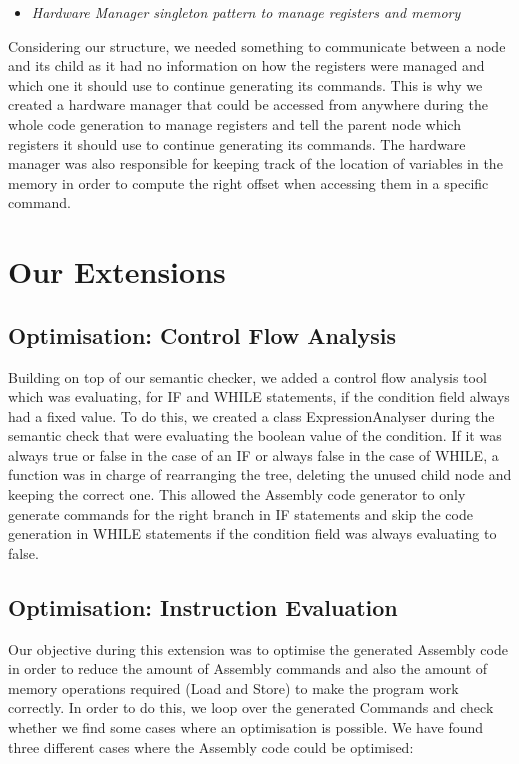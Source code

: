 \documentclass[a4wide, 11pt]{article}
\begin{document}
\begin{itemize}
\item \textit{Hardware Manager singleton pattern to manage registers and memory}
\end{itemize}

Considering our structure, we needed something to communicate between a node and its child as it had no information on how the registers were managed and which one it should use to continue generating its commands. This is why we created a hardware manager that could be accessed from anywhere during the whole code generation to manage registers and tell the parent node which registers it should use to continue generating its commands. The hardware manager was also responsible for keeping track of the location of variables in the memory in order to compute the right offset when accessing them in a specific command.



\section{Our Extensions}

\subsection{Optimisation: Control Flow Analysis}

Building on top of our semantic checker, we added a control flow analysis tool which was evaluating, for IF and WHILE statements, if the condition field always had a fixed value. To do this, we created a class ExpressionAnalyser during the semantic check that were evaluating the boolean value of the condition. If it was always true or false in the case of an IF or always false in the case of WHILE, a function was in charge of rearranging the tree, deleting the unused child node and keeping the correct one. This allowed the Assembly code generator to only generate commands for the right branch in IF statements and skip the code generation in WHILE statements if the condition field was always evaluating to false.

\subsection{Optimisation: Instruction Evaluation}

Our objective during this extension was to optimise the generated Assembly code in order to reduce the amount of Assembly commands and also the amount of memory operations required (Load and Store) to make the program work correctly. In order to do this, we loop over the generated Commands and check whether we find some cases where an optimisation is possible. 
We have found three different cases where the Assembly code could be optimised: 
\end{document}
